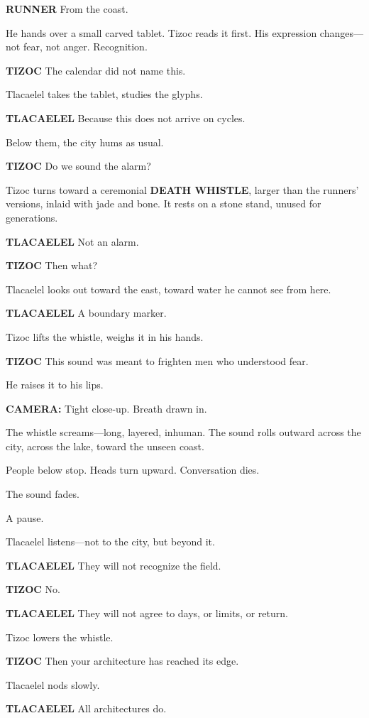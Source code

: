 \documentclass[12pt]{article}
\begin{document}
\textbf{RUNNER}  
From the coast.

He hands over a small carved tablet. Tizoc reads it first. His expression changes—not fear, not anger. Recognition.

\textbf{TIZOC}  
The calendar did not name this.

Tlacaelel takes the tablet, studies the glyphs.

\textbf{TLACAELEL}  
Because this does not arrive on cycles.

Below them, the city hums as usual.

\textbf{TIZOC}  
Do we sound the alarm?

Tizoc turns toward a ceremonial \textbf{DEATH WHISTLE}, larger than the runners’ versions, inlaid with jade and bone. It rests on a stone stand, unused for generations.

\textbf{TLACAELEL}  
Not an alarm.

\textbf{TIZOC}  
Then what?

Tlacaelel looks out toward the east, toward water he cannot see from here.

\textbf{TLACAELEL}  
A boundary marker.

Tizoc lifts the whistle, weighs it in his hands.

\textbf{TIZOC}  
This sound was meant to frighten men  
who understood fear.

He raises it to his lips.

\textbf{CAMERA:} Tight close-up. Breath drawn in.

The whistle screams—long, layered, inhuman. The sound rolls outward across the city, across the lake, toward the unseen coast.

People below stop. Heads turn upward. Conversation dies.

The sound fades.

A pause.

Tlacaelel listens—not to the city, but beyond it.

\textbf{TLACAELEL}  
They will not recognize the field.

\textbf{TIZOC}  
No.

\textbf{TLACAELEL}  
They will not agree to days,  
or limits,  
or return.

Tizoc lowers the whistle.

\textbf{TIZOC}  
Then your architecture has reached its edge.

Tlacaelel nods slowly.

\textbf{TLACAELEL}  
All architectures do.
\end{document}
